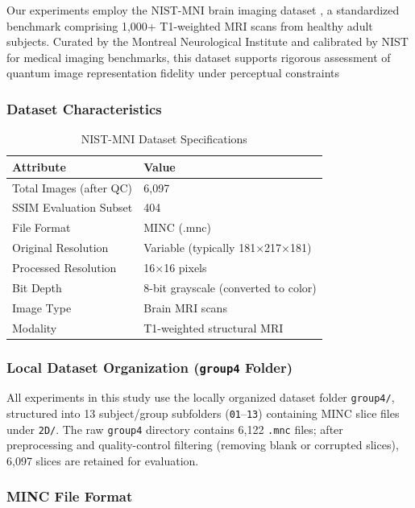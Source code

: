 \documentclass[11pt,a4paper]{article}
\begin{document}
Our experiments employ the NIST-MNI brain imaging dataset \cite{ref43,ref44}, a standardized benchmark comprising 1,000+ T1-weighted MRI scans  from healthy adult subjects. Curated by the Montreal Neurological Institute and calibrated by NIST for medical imaging benchmarks, this dataset supports rigorous assessment of quantum image representation fidelity under perceptual constraints

\subsubsection{Dataset Characteristics}

\begin{table}[H]
\centering
\caption{NIST-MNI Dataset Specifications}
\label{tab:dataset}
\begin{tabular}{@{}ll@{}}
\toprule
\textbf{Attribute} & \textbf{Value} \\
\midrule
Total Images (after QC) & 6,097 \\
SSIM Evaluation Subset & 404 \\
File Format & MINC (.mnc) \\
Original Resolution & Variable (typically 181×217×181) \\
Processed Resolution & 16×16 pixels \\
Bit Depth & 8-bit grayscale (converted to color) \\
Image Type & Brain MRI scans \\
Modality & T1-weighted structural MRI \\
\bottomrule
\end{tabular}
\end{table}

\subsubsection{Local Dataset Organization (\texttt{group4} Folder)}
All experiments in this study use the locally organized dataset folder \texttt{group4/}, structured into 13 subject/group subfolders (\texttt{01}--\texttt{13}) containing MINC slice files under \texttt{2D/}. The raw \texttt{group4} directory contains 6,122 \texttt{.mnc} files; after preprocessing and quality-control filtering (removing blank or corrupted slices), 6,097 slices are retained for evaluation.

\subsubsection{MINC File Format}
\end{document}
